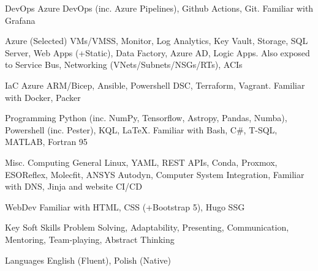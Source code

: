 

\begin{cvskills}

  \cvskill
    {DevOps} 
    {Azure DevOps (inc. Azure Pipelines), Github Actions, Git. Familiar with Grafana} 

  \cvskill
    {Azure (Selected)} 
    {VMs/VMSS, Monitor, Log Analytics, Key Vault, Storage, SQL Server, Web Apps (+Static), Data Factory, Azure AD, Logic Apps. Also exposed to Service Bus, Networking (VNets/Subnets/NSGs/RTs), ACIs}

  \cvskill
    {IaC} 
    {Azure ARM/Bicep, Ansible, Powershell DSC, Terraform, Vagrant. Familiar with Docker, Packer} 

  \cvskill
    {Programming} 
    {Python (inc. NumPy, Tensorflow, Astropy, Pandas, Numba), Powershell (inc. Pester), KQL, \LaTeX. Familiar with Bash, C\#, T-SQL, MATLAB, Fortran 95} 
    
  \cvskill
    {Misc. Computing} 
    {General Linux, YAML, REST APIs, Conda, Proxmox, ESOReflex, Molecfit, ANSYS Autodyn, Computer System Integration, Familiar with DNS, Jinja and website CI/CD} 

  \cvskill
    {WebDev} 
    {Familiar with HTML, CSS (+Bootstrap 5), Hugo SSG} 

  \cvskill
    {Key Soft Skills} 
    {Problem Solving, Adaptability, Presenting, Communication, Mentoring, Team-playing, Abstract Thinking} 

  \cvskill
    {Languages} 
    {English (Fluent), Polish (Native)} 
    
\end{cvskills}
